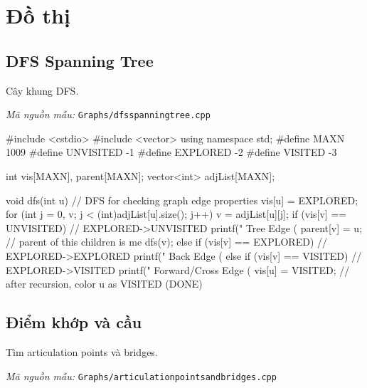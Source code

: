 \documentclass[11pt]{article}
\newcommand{\codepath}[1]{\par\noindent\textit{Mã nguồn mẫu:} \texttt{#1}\par}
\begin{document}
\clearpage

\section{Đồ thị}

\subsection{DFS Spanning Tree}

Cây khung DFS.

\codepath{Graphs/dfsspanningtree.cpp}

\begingroup\scriptsize
\begin{vncode}
#include <cstdio>
#include <vector>
using namespace std;
#define MAXN 1009
#define UNVISITED -1
#define EXPLORED -2
#define VISITED -3

int vis[MAXN], parent[MAXN];
vector<int> adjList[MAXN];

void dfs(int u) { // DFS for checking graph edge properties
	vis[u] = EXPLORED;
	for (int j = 0, v; j < (int)adjList[u].size(); j++) {
		v = adjList[u][j];
		if (vis[v] == UNVISITED) { // EXPLORED->UNVISITED
			printf(" Tree Edge (%
			parent[v] = u; // parent of this children is me
			dfs(v);
		}
		else if (vis[v] == EXPLORED) { // EXPLORED->EXPLORED
			printf(" Back Edge (%
		}
		else if (vis[v] == VISITED) // EXPLORED->VISITED
			printf(" Forward/Cross Edge (%
	}
	vis[u] = VISITED; // after recursion, color u as VISITED (DONE)
}
\end{vncode}
\endgroup


\subsection{Điểm khớp và cầu}

Tìm articulation points và bridges.

\codepath{Graphs/articulationpointsandbridges.cpp}
\end{document}
